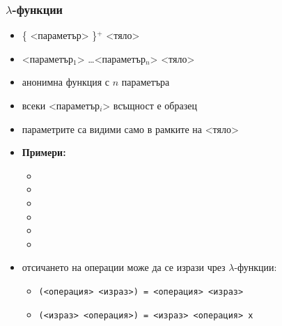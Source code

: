 \documentclass{beamer}
\begin{document}
\begin{frame}
  \frametitle{$\lambda$-функции}  \begin{itemize}[<+->]

  \item \tta{\textbackslash}\{ <параметър> \}$^+$ \tta{->} <тяло>
  \item \tta{\textbackslash} <параметър$_1$> \ldots <параметър$_n$> \tta{->} <тяло>
  \item анонимна функция с $n$ параметъра
  \item всеки <параметър$_i$> всъщност е образец
  \item параметрите са видими само в рамките на <тяло>
  \item \textbf{Примери:}
    \begin{itemize}
    \item {}
    \item {}
    \item {}
    \item {}
    \item {}
    \item {}
    \end{itemize}
  \item отсичането на операции може да се изрази чрез $\lambda$-функции:
    \begin{itemize}
    \item \tt(<операция> <израз>\tt) =  <операция> <израз>
    \item \tt(<израз> <операция>\tt) = \lst{\\x ->}  <израз> <операция> \tt x
    \end{itemize}
  \end{itemize}
\end{frame}
\end{document}
